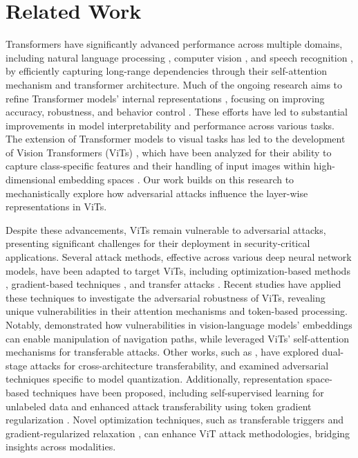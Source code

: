 \section{Related Work}
Transformers \cite{vaswani2017attention} have significantly advanced performance across multiple domains, including natural language processing \cite{devlin2018bert}, computer vision \cite{dosovitskiy2020image}, and speech recognition \cite{dong2018speech}, by efficiently capturing long-range dependencies through their self-attention mechanism and transformer architecture. Much of the ongoing research aims to refine Transformer models' internal representations \cite{devlin2018bert, biswas2022geometric, zou2023representation, raghu2021vision}, focusing on improving accuracy, robustness, and behavior control \cite{zhang2024towards}. These efforts have led to substantial improvements in model interpretability and performance across various tasks. The extension of Transformer models to visual tasks has led to the development of Vision Transformers (ViTs) \cite{dosovitskiy2020image}, which have been analyzed for their ability to capture class-specific features \cite{vilas2024analyzing} and their handling of input images within high-dimensional embedding spaces \cite{salman2024intriguing}. Our work builds on this research to mechanistically explore how adversarial attacks influence the layer-wise representations in ViTs.

Despite these advancements, ViTs remain vulnerable to adversarial attacks, presenting significant challenges for their deployment in security-critical applications. Several attack methods, effective across various deep neural network models, have been adapted to target ViTs, including optimization-based methods \cite{carlini2017towards, carlini2017adversarialexampleseasilydetected, moosavi2016deepfool}, gradient-based techniques \cite{goodfellow2014explaining, madry2017towards, kurakin2018adversarial, papernot2016limitations}, and transfer attacks \cite{papernot2016transferability}. Recent studies \cite{shao2021adversarial, kim2024exploring, wang2022understanding} have applied these techniques to investigate the adversarial robustness of ViTs, revealing unique vulnerabilities in their attention mechanisms and token-based processing. Notably, \cite{islam2024malicious} demonstrated how vulnerabilities in vision-language models' embeddings can enable manipulation of navigation paths, while \cite{wei2022towards} leveraged ViTs' self-attention mechanisms for transferable attacks. Other works, such as \cite{wang2024dual}, have explored dual-stage attacks for cross-architecture transferability, and \cite{baras2023quantattack} examined adversarial techniques specific to model quantization. Additionally, representation space-based techniques \cite{salman2024intriguing} have been proposed, including self-supervised learning for unlabeled data \cite{rando2022exploring} and enhanced attack transferability using token gradient regularization \cite{zhang2023transferable}. Novel optimization techniques, such as transferable triggers \cite{wallace2019universal} and gradient-regularized relaxation \cite{chacko2024adversarial}, can enhance ViT attack methodologies, bridging insights across modalities.

